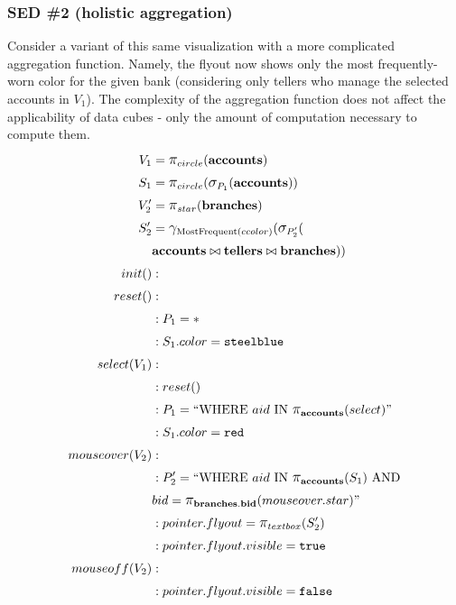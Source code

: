 \subsubsection{SED \#2 (holistic aggregation)}
Consider a variant of this same visualization with a more complicated aggregation function.
Namely, the flyout now shows only the most frequently-worn color for the given bank (considering only tellers who manage the selected accounts in $V_1$).
The complexity of the aggregation function does not affect the applicability of data cubes - only the amount of computation necessary to compute them.
\begin{align*}
	V_1&= \mathlarger{\pi}_{circle}(\bf{accounts})\\
	S_1&= \mathlarger{\pi}_{circle}(\mathlarger{\sigma}_{P_1}(\bf{accounts}))\\
	V_2'&= \mathlarger{\pi}_{star}(\bf{branches})\\
	S_2'&= \mathlarger{\gamma}_{\text{MostFrequent}(ccolor)}(\mathlarger{\sigma}_{P_2'}(\\&\bf{accounts}\bowtie{}\bf{tellers}\bowtie{}\bf{branches}))\\
	init()&:\\
	reset()&:\\
	&: P_1 = *\\
	&: S_1.color = \texttt{steelblue}\\
	select(V_1)&:\\
	&: reset()\\
	&: P_1 = ``\text{WHERE}~aid~\text{IN}~\mathlarger{\pi}_{\bf{accounts}}(select)"\\
	&: S_1.color = \texttt{red}\\
	mouseover(V_2)&:\\
	&: P_2' = ``\text{WHERE}~aid~\text{IN}~\mathlarger{\pi}_{\bf{accounts}}(S_1)~\text{AND}\\&bid=\mathlarger{\pi}_{\bf{branches.bid}}(mouseover.star)"\\
	&: pointer.flyout = \mathlarger{\pi}_{textbox}(S_2')\\
	&: pointer.flyout.visible = \texttt{true}\\
	mouseoff(V_2)&:\\
	&: pointer.flyout.visible = \texttt{false}\\
\end{align*}
